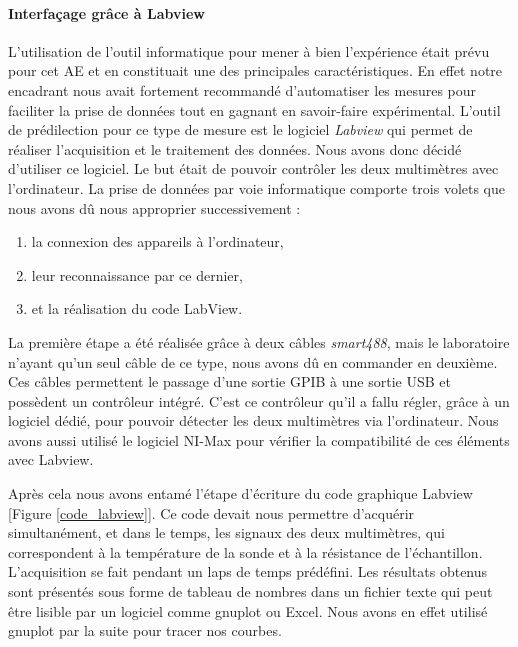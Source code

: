 \paragraph{Interfaçage grâce à Labview}
L'utilisation de l'outil informatique pour mener à bien l'expérience était prévu pour cet AE et en constituait une des principales caractéristiques. En effet notre encadrant nous avait fortement recommandé d'automatiser les mesures pour faciliter la prise de données tout en gagnant en savoir-faire expérimental. L'outil de prédilection pour ce type de mesure est le logiciel \emph{Labview} qui permet de réaliser l'acquisition et le traitement des données. Nous avons donc décidé d'utiliser ce logiciel. Le but était de pouvoir contrôler les deux multimètres avec l'ordinateur. La prise de données par voie informatique comporte trois volets que nous avons dû nous approprier successivement : 

\begin{enumerate}
\item la connexion des appareils à l'ordinateur, 
\item leur reconnaissance par ce dernier, 
\item et la réalisation du code LabView. 
\end{enumerate}

La première étape a été réalisée grâce à deux câbles \emph{smart488}, mais le laboratoire n'ayant qu'un seul câble de ce type, nous avons dû en commander en deuxième.
Ces câbles permettent le passage d'une sortie GPIB à une sortie USB et possèdent un contrôleur intégré. 
C'est ce contrôleur qu'il a fallu régler, grâce à un logiciel dédié, pour pouvoir détecter les deux multimètres 
via l'ordinateur. Nous avons aussi utilisé le logiciel NI-Max pour vérifier la compatibilité de ces éléments avec Labview. 

Après cela nous avons entamé l'étape d'écriture du code graphique Labview [Figure \ref{code_labview}]. Ce code devait nous permettre d'acquérir 
simultanément, et dans le temps, les signaux des deux multimètres, qui correspondent à la température de la sonde 
et à la résistance de l'échantillon. L'acquisition se fait pendant un laps de temps prédéfini. Les résultats obtenus sont présentés sous forme de tableau de nombres dans un fichier texte qui peut être lisible par un logiciel comme gnuplot ou Excel.
Nous avons en effet utilisé gnuplot par la suite pour tracer nos courbes.

